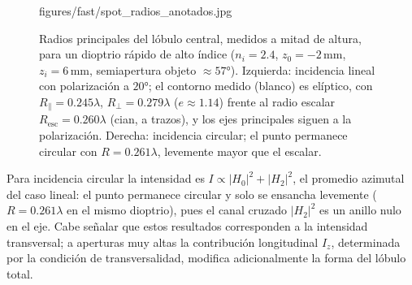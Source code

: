 \begin{figure}[H]
  \centering
    {figures/fast/spot_radios_anotados.jpg}
  \caption{Radios principales del lóbulo central, medidos a mitad de altura,
  para un dioptrio rápido de alto índice ($n_i=2.4$, $z_0=-2\,\mathrm{mm}$,
  $z_i=6\,\mathrm{mm}$, semiapertura objeto $\approx 57°$). Izquierda:
  incidencia lineal con polarización a $20°$; el contorno medido (blanco) es
  elíptico, con $R_\parallel=0.245\lambda$, $R_\perp=0.279\lambda$
  ($e\approx1.14$) frente al radio escalar $R_{\mathrm{esc}}=0.260\lambda$
  (cian, a trazos), y los ejes principales siguen a la polarización. Derecha:
  incidencia circular; el punto permanece circular con $R=0.261\lambda$,
  levemente mayor que el escalar.}
  \label{fig:spot-radios-anotados}
\end{figure}

Para incidencia circular la intensidad es $I\propto|H_0|^2+|H_2|^2$, el
promedio azimutal del caso lineal: el punto permanece circular y solo se
ensancha levemente ($R=0.261\lambda$ en el mismo dioptrio), pues el canal
cruzado $|H_2|^2$ es un anillo nulo en el eje. Cabe señalar que estos
resultados corresponden a la intensidad transversal; a aperturas muy altas la
contribución longitudinal $I_z$, determinada por la condición de
transversalidad, modifica adicionalmente la forma del lóbulo total.
